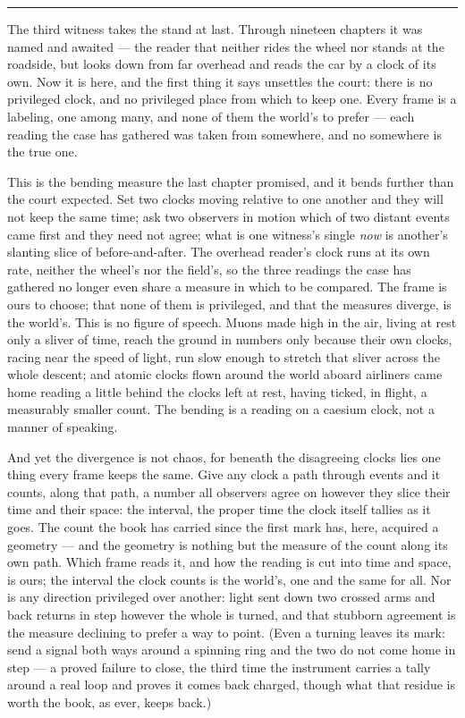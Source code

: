 \bigskip
\begin{center}
\rule{0.4\textwidth}{0.4pt}
\end{center}
\bigskip

\noindent The third witness takes the stand at last. Through nineteen chapters it was named and awaited --- the
reader that neither rides the wheel nor stands at the roadside, but looks down from far overhead and reads the
car by a clock of its own. Now it is here, and the first thing it says unsettles the court: there is no
privileged clock, and no privileged place from which to keep one. Every frame is a labeling, one among many, and
none of them the world's to prefer --- each reading the case has gathered was taken from somewhere, and no
somewhere is the true one.

This is the bending measure the last chapter promised, and it bends further than the court expected. Set two
clocks moving relative to one another and they will not keep the same time; ask two observers in motion which of
two distant events came first and they need not agree; what is one witness's single \emph{now} is another's
slanting slice of before-and-after. The overhead reader's clock runs at its own rate, neither the wheel's nor
the field's, so the three readings the case has gathered no longer even share a measure in which to be compared.
The frame is ours to choose; that none of them is privileged, and that the measures diverge, is the world's.
This is no figure of speech. Muons made high in the air, living at rest only a sliver of time, reach the ground
in numbers only because their own clocks, racing near the speed of light, run slow enough to stretch that sliver
across the whole descent; and atomic clocks flown around the world aboard airliners came home reading a little
behind the clocks left at rest, having ticked, in flight, a measurably smaller count. The bending is a reading
on a caesium clock, not a manner of speaking.

And yet the divergence is not chaos, for beneath the disagreeing clocks lies one thing every frame keeps the
same. Give any clock a path through events and it counts, along that path, a number all observers agree on
however they slice their time and their space: the interval, the proper time the clock itself tallies as it
goes. The count the book has carried since the first mark has, here, acquired a geometry --- and the geometry is
nothing but the measure of the count along its own path. Which frame reads it, and how the reading is cut into
time and space, is ours; the interval the clock counts is the world's, one and the same for all. Nor is any
direction privileged over another: light sent down two crossed arms and back returns in step however the whole
is turned, and that stubborn agreement is the measure declining to prefer a way to point. (Even a turning
leaves its mark: send a signal both ways around a spinning ring and the two do not come home in step --- a
proved failure to close, the third time the instrument carries a tally around a real loop and proves it comes
back charged, though what that residue is worth the book, as ever, keeps back.)

